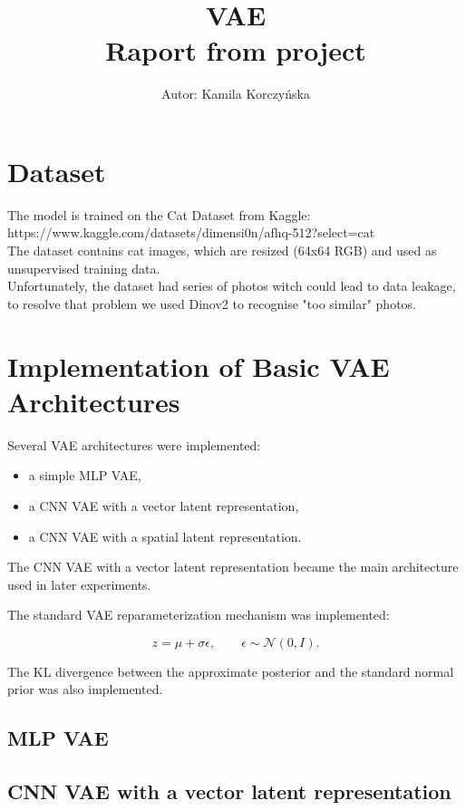 \documentclass[a4paper,11pt]{article}
\title{\textbf{VAE}\\
Raport from project}
\author{Autor: Kamila Korczyńska\textbf{}}
\date{}
\begin{document}
\thispagestyle{empty}
\maketitle
\mbox{}

\section{Dataset}
The model is trained on the Cat Dataset from Kaggle:\\
https://www.kaggle.com/datasets/dimensi0n/afhq-512?select=cat\\

The dataset contains cat images, which are resized (64x64 RGB) and used as unsupervised training data.\\
Unfortunately, the dataset had series of photos witch could lead to data leakage, to resolve that problem we used Dinov2 to recognise "too similar" photos. 

\section{Implementation of Basic VAE Architectures}

Several VAE architectures were implemented:

\begin{itemize}
    \item a simple MLP VAE,
    \item a CNN VAE with a vector latent representation,
    \item a CNN VAE with a spatial latent representation.
\end{itemize}

The CNN VAE with a vector latent representation became the main architecture used in later experiments.

The standard VAE reparameterization mechanism was implemented:

\[
z = \mu + \sigma \epsilon,
\qquad
\epsilon \sim \mathcal{N}(0,I).
\]

The KL divergence between the approximate posterior and the standard normal prior was also implemented.

\subsection{MLP VAE}
\subsection{CNN VAE with a vector latent representation}
\end{document}
